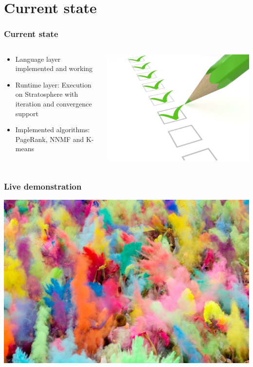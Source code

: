 \section{Current state}

\begin{frame}
	\frametitle{Current state}
	\begin{columns}
		\begin{column}{0.6\textwidth}
			\begin{itemize}
				\item Language layer implemented and working
				\item Runtime layer: Execution on Stratosphere with iteration and convergence support
				\item Implemented algorithms: PageRank, NNMF and K-means
			\end{itemize}
		\end{column}
		\begin{column}{0.4\textwidth}
			\includegraphics[width=\textwidth]{images/checklist.jpg}
		\end{column}
	\end{columns}
\end{frame}

\begin{frame}
	\frametitle{Live demonstration}
	\includegraphics[width=\textwidth]{images/holi.jpg}
\end{frame}